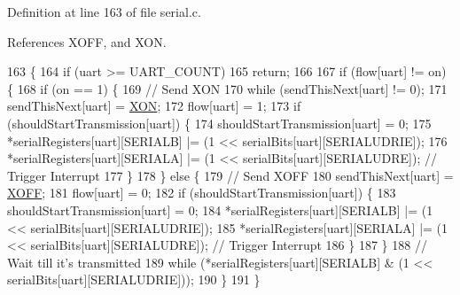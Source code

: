 Definition at line 163 of file serial.\-c.



References X\-O\-F\-F, and X\-O\-N.


\begin{DoxyCode}
163                                        \{
164     \textcolor{keywordflow}{if} (uart >= UART\_COUNT)
165         \textcolor{keywordflow}{return};
166 
167     \textcolor{keywordflow}{if} (flow[uart] != on) \{
168         \textcolor{keywordflow}{if} (on == 1) \{
169             \textcolor{comment}{// Send XON}
170             \textcolor{keywordflow}{while} (sendThisNext[uart] != 0);
171             sendThisNext[uart] = \hyperlink{group__uart_gacdf721774c51e08c6609e6fa8cf82cc9}{XON};
172             flow[uart] = 1;
173             \textcolor{keywordflow}{if} (shouldStartTransmission[uart]) \{
174                 shouldStartTransmission[uart] = 0;
175                 *serialRegisters[uart][SERIALB] |= (1 << serialBits[uart][SERIALUDRIE]);
176                 *serialRegisters[uart][SERIALA] |= (1 << serialBits[uart][SERIALUDRE]); \textcolor{comment}{// Trigger
       Interrupt}
177             \}
178         \} \textcolor{keywordflow}{else} \{
179             \textcolor{comment}{// Send XOFF}
180             sendThisNext[uart] = \hyperlink{group__uart_ga67fd78ae15d2b67c10d44d69a49ab1c5}{XOFF};
181             flow[uart] = 0;
182             \textcolor{keywordflow}{if} (shouldStartTransmission[uart]) \{
183                 shouldStartTransmission[uart] = 0;
184                 *serialRegisters[uart][SERIALB] |= (1 << serialBits[uart][SERIALUDRIE]);
185                 *serialRegisters[uart][SERIALA] |= (1 << serialBits[uart][SERIALUDRE]); \textcolor{comment}{// Trigger
       Interrupt}
186             \}
187         \}
188         \textcolor{comment}{// Wait till it's transmitted}
189         \textcolor{keywordflow}{while} (*serialRegisters[uart][SERIALB] & (1 << serialBits[uart][SERIALUDRIE]));
190     \}
191 \}
\end{DoxyCode}
